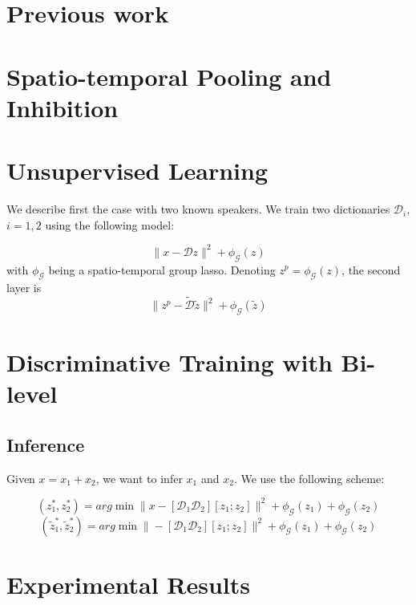 \documentclass[11pt]{article} %
\begin{document}
\section{Previous work}


\section{Spatio-temporal Pooling and Inhibition}


\section{Unsupervised Learning}

We describe first the case with two known speakers. 
We train two dictionaries $\mathcal{D}_i$, $i=1,2$ using 
the following model:

\begin{equation}
\| x - \mathcal{D} z \|^2 + \phi_{\mathcal{G}}(z) 
\end{equation}
with $\phi_{\mathcal{G}}$ being a spatio-temporal group lasso. 
 Denoting ${z}^p = \phi_{\mathcal{G}}(z) $, 
the second layer is
\begin{equation}
\|{z}^p  - \widetilde{\mathcal{D}} \tilde{z} \|^2 + \phi_{\mathcal{G}}(\tilde{z}) 
\end{equation}


\section{Discriminative Training with Bi-level}

\subsection{Inference}
Given $x=x_1 + x_2$, we want to infer $x_1$ and $x_2$. 
We use the following scheme:

\begin{equation}
(z_1^*, z_2^*) = arg \min \| x - [\mathcal{D}_1 \mathcal{D}_2] [z_1 ; z_2] \|^2 + \phi_{\mathcal{G}}(z_1)  + \phi_{\mathcal{G}}(z_2) 
\end{equation}
\begin{equation}
(\tilde{z}_1^*, \tilde{z}_2^*) = arg \min \|  - [\mathcal{D}_1 \mathcal{D}_2] [z_1 ; z_2] \|^2 + \phi_{\mathcal{G}}(z_1)  + \phi_{\mathcal{G}}(z_2) 
\end{equation}




\section{Experimental Results}
\end{document}
